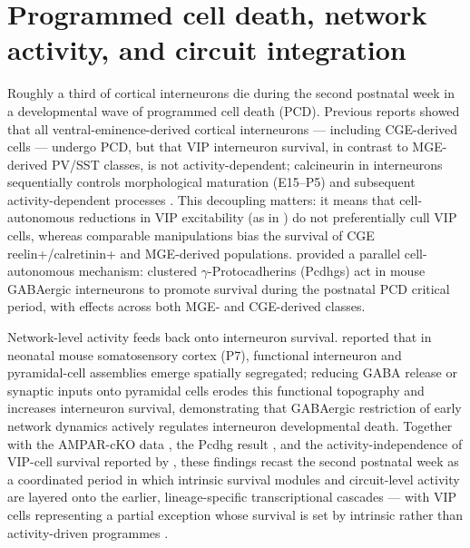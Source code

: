 \documentclass[11pt]{article}
\begin{document}
\section{Programmed cell death, network activity, and circuit integration}

Roughly a third of cortical interneurons die during the second postnatal week in a developmental wave of programmed cell death (PCD). Previous reports showed that all ventral-eminence-derived cortical interneurons --- including CGE-derived cells --- undergo PCD, but that VIP interneuron survival, in contrast to MGE-derived PV/SST classes, is not activity-dependent; calcineurin in interneurons sequentially controls morphological maturation (E15--P5) and subsequent activity-dependent processes \citep{Priya2018}. This decoupling matters: it means that cell-autonomous reductions in VIP excitability (as in \citet{Demarcogarcia2011}) do not preferentially cull VIP cells, whereas comparable manipulations bias the survival of CGE reelin+/calretinin+ and MGE-derived populations. \citet{Carriere2020} provided a parallel cell-autonomous mechanism: clustered $\gamma$-Protocadherins (Pcdhgs) act in mouse GABAergic interneurons to promote survival during the postnatal PCD critical period, with effects across both MGE- and CGE-derived classes.

Network-level activity feeds back onto interneuron survival. \citet{Duan2020} reported that in neonatal mouse somatosensory cortex (P7), functional interneuron and pyramidal-cell assemblies emerge spatially segregated; reducing GABA release or synaptic inputs onto pyramidal cells erodes this functional topography and increases interneuron survival, demonstrating that GABAergic restriction of early network dynamics actively regulates interneuron developmental death. Together with the AMPAR-cKO data \citep{Akgul2019}, the Pcdhg result \citep{Carriere2020}, and the activity-independence of VIP-cell survival reported by \citet{Priya2018}, these findings recast the second postnatal week as a coordinated period in which intrinsic survival modules and circuit-level activity are layered onto the earlier, lineage-specific transcriptional cascades --- with VIP cells representing a partial exception whose survival is set by intrinsic rather than activity-driven programmes \citep{Demarcogarcia2025}.
\end{document}
